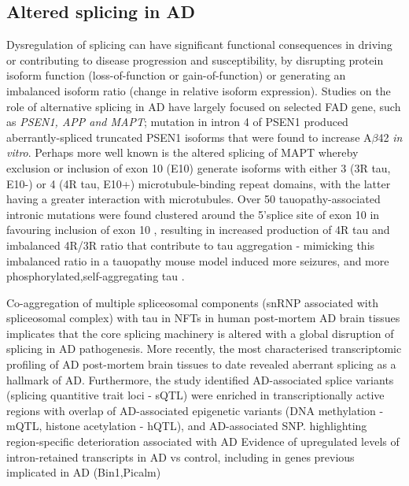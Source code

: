 \newpage
\subsection{Altered splicing in AD}
Dysregulation of splicing can have significant functional consequences in driving or contributing to disease progression and susceptibility, by disrupting protein isoform function (loss-of-function or gain-of-function) or generating an imbalanced isoform ratio (change in relative isoform expression). Studies on the role of alternative splicing in AD have largely focused on selected FAD gene, such as \textit{PSEN1, APP and MAPT}; mutation in intron 4 of PSEN1 produced aberrantly-spliced truncated PSEN1 isoforms that were found to increase A$\beta$42 \textit{in vitro}\cite{DeJonghe1999}. Perhaps more well known is the altered splicing of MAPT whereby exclusion or inclusion of exon 10 (E10) generate isoforms with either 3 (3R tau, E10-) or 4 (4R tau, E10+) microtubule-binding repeat domains, with the latter having a greater interaction with microtubules. Over 50 tauopathy-associated intronic mutations were found clustered around the 5'splice site of exon 10 in favouring inclusion of exon 10 \cite{DSouza1999, Ghetti2015}, resulting in increased production of 4R tau and imbalanced 4R/3R ratio that contribute to tau aggregation \cite{Adams2010} - mimicking this imbalanced ratio in a tauopathy mouse model induced more seizures, and more phosphorylated,self-aggregating tau \cite{Schoch2016}.  



Co-aggregation of multiple spliceosomal components (snRNP associated with spliceosomal complex) with tau in NFTs in human post-mortem AD brain tissues implicates that the core splicing machinery is altered with a global disruption of splicing in AD pathogenesis\cite{Bai2013}. More recently, the most characterised transcriptomic profiling of AD post-mortem brain tissues\cite{Raj2018} to date revealed aberrant splicing as a hallmark of AD. Furthermore, the study identified AD-associated splice variants (splicing quantitive trait loci - sQTL) were enriched in transcriptionally active regions with overlap of AD-associated epigenetic variants (DNA methylation - mQTL, histone acetylation - hQTL), and AD-associated SNP. 
highlighting region-specific deterioration associated with AD\cite{Mills2013}
Evidence of upregulated levels of intron-retained transcripts in AD vs control, including in genes previous implicated in AD (Bin1,Picalm)\cite{Li2021}

